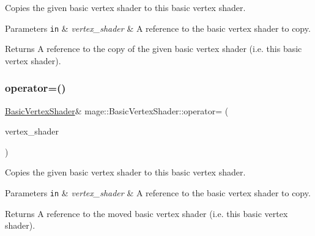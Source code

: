 Copies the given basic vertex shader to this basic vertex shader.


\begin{DoxyParams}[1]{Parameters}
\mbox{\tt in}  & {\em vertex\+\_\+shader} & A reference to the basic vertex shader to copy. \\
\hline
\end{DoxyParams}
\begin{DoxyReturn}{Returns}
A reference to the copy of the given basic vertex shader (i.\+e. this basic vertex shader). 
\end{DoxyReturn}
\hypertarget{classmage_1_1_basic_vertex_shader_ae5442c36b5f913ac6644cc2945a8c20a}{}\label{classmage_1_1_basic_vertex_shader_ae5442c36b5f913ac6644cc2945a8c20a} 
\subsubsection{\texorpdfstring{operator=()}{operator=()}\hspace{0.1cm}{\footnotesize\ttfamily [2/2]}}
{\footnotesize\ttfamily \hyperlink{classmage_1_1_basic_vertex_shader}{Basic\+Vertex\+Shader}\& mage\+::\+Basic\+Vertex\+Shader\+::operator= (\begin{DoxyParamCaption}\item[{\hyperlink{classmage_1_1_basic_vertex_shader}{Basic\+Vertex\+Shader} \&\&}]{vertex\+\_\+shader }\end{DoxyParamCaption})\hspace{0.3cm}{\ttfamily [delete]}}

Copies the given basic vertex shader to this basic vertex shader.


\begin{DoxyParams}[1]{Parameters}
\mbox{\tt in}  & {\em vertex\+\_\+shader} & A reference to the basic vertex shader to copy. \\
\hline
\end{DoxyParams}
\begin{DoxyReturn}{Returns}
A reference to the moved basic vertex shader (i.\+e. this basic vertex shader). 
\end{DoxyReturn}
\hypertarget{classmage_1_1_basic_vertex_shader_ae565cb19b96591d5d1ff36ac0ff7344c}{}\label{classmage_1_1_basic_vertex_shader_ae565cb19b96591d5d1ff36ac0ff7344c} 
